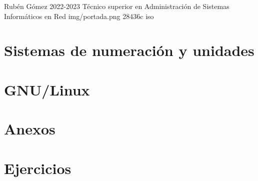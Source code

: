 \documentclass{\ClassPath/yukibook}
\begin{document}
    {Rubén Gómez}  %
    {2022-2023}    %
    {Técnico superior en Administración de \linebreak Sistemas Informáticos en Red} %
    {}%
    {}%
    {img/portada.png} %
    {28436c}
    {iso} %

    \coverpage

    \tableofcontents

    \part{Sistemas de numeración y unidades}
    \graphicspath{{../../../temas_comunes/sistemas_de_numeracion/img/}}
    

    \graphicspath{{../../../temas_comunes/unidades_informacion/img/}}
    

    \vfill
    \pagebreak
    \part{GNU/Linux}
    \graphicspath{{../../../temas_comunes/gnu_linux/img}}
    
    

    \part{Anexos}

    \graphicspath{{../../../anexos/virtualbox_networking/img}}
    

    

    \graphicspath{{../../../anexos/}}
    

    \part{Ejercicios}
    
\end{document}
